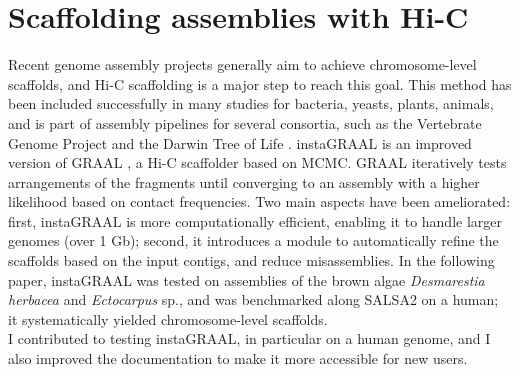 
\chapter{Scaffolding assemblies with Hi-C}

Recent genome assembly projects generally aim to achieve chromosome-level scaffolds, and Hi-C scaffolding is a major step to reach this goal. This method has been included successfully in many studies for bacteria, yeasts, plants, animals, and is part of assembly pipelines for several consortia, such as the Vertebrate Genome Project \cite{vgp} and the Darwin Tree of Life \cite{dtol}. instaGRAAL is an improved version of GRAAL \cite{graal}, a Hi-C scaffolder based on MCMC. GRAAL iteratively tests arrangements of the fragments until converging to an assembly with a higher likelihood based on contact frequencies. Two main aspects have been ameliorated: first, instaGRAAL is more computationally efficient, enabling it to handle larger genomes (over 1 Gb); second, it introduces a module to automatically refine the scaffolds based on the input contigs, and reduce misassemblies. In the following paper, instaGRAAL was tested on assemblies of the brown algae \textit{Desmarestia herbacea} and \textit{Ectocarpus} sp., and was benchmarked along SALSA2 \cite{salsa2} on a human; it systematically yielded chromosome-level scaffolds. \\
I contributed to testing instaGRAAL, in particular on a human genome, and I also improved the documentation to make it more accessible for new users. \\

